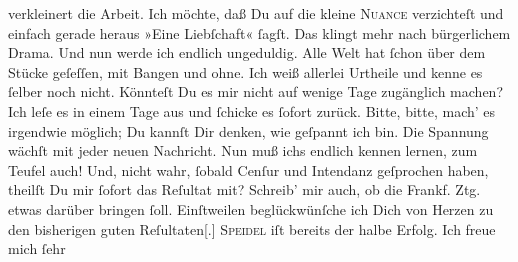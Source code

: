                verkleinert die Arbeit. Ich möchte, daß Du auf die kleine \textsc{Nuance} verzichteſt und einfach gerade heraus »Eine Liebſchaft«{ }ſagſt. Das
               klingt mehr nach bürgerlichem Drama. Und nun werde ich endlich ungeduldig. Alle Welt
               hat{ }ſchon über dem Stücke
               geſeſſen, mit  Bangen und ohne. Ich weiß allerlei
               Urtheile und kenne es{ }ſelber noch nicht. Könnteſt Du es mir nicht auf wenige Tage
               zugänglich machen? Ich leſe es in einem Tage aus und{ }ſchicke es{ }ſofort zurück. Bitte,
               bitte, mach’ es irgendwie möglich; Du kannſt Dir denken, wie geſpannt {\pb}ich bin. Die Spannung wächſt mit jeder neuen
               Nachricht. Nun muß ichs endlich kennen lernen, zum Teufel auch! Und, nicht wahr,{ }ſobald Cenſur und Intendanz geſprochen haben, theilſt Du mir{ }ſofort das Reſultat mit?
               Schreib’ mir auch, ob die Frankf. Ztg. etwas
               darüber bringen{ }ſoll. Einſtweilen beglückwünſche ich Dich von Herzen zu den
               bisherigen guten Reſultaten{[}.{]}{ }\textsc{Speidel} iſt bereits der halbe Erfolg. Ich freue mich{ }ſehr{\dotsfive}\pend
           
